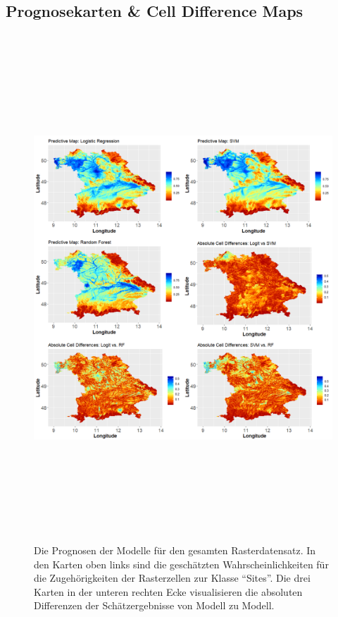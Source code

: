 \subsection{Prognosekarten \& Cell Difference Maps}
\begin{figure}[H]
    \centering
    \includegraphics[width = 15cm, height = 19cm]{Figures/pmapsfinal.png}
    \caption{Die Prognosen der Modelle für den gesamten Rasterdatensatz. In den Karten oben links sind die geschätzten Wahrscheinlichkeiten für die Zugehörigkeiten der Rasterzellen zur Klasse ``Sites''. Die drei Karten in der unteren rechten Ecke visualisieren die absoluten Differenzen der Schätzergebnisse von Modell zu Modell.}
    \label{pmapsfinal}
\end{figure}
